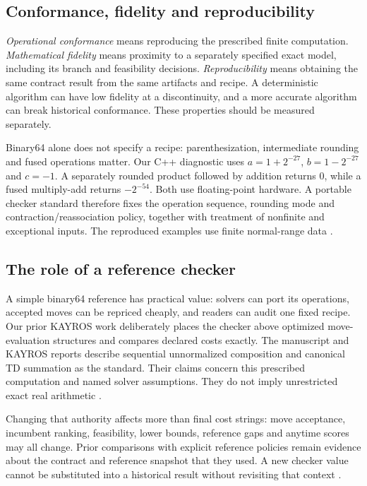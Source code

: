 \subsection{Conformance, fidelity and reproducibility}

\emph{Operational conformance} means reproducing the prescribed finite computation. \emph{Mathematical fidelity} means proximity to a separately specified exact model, including its branch and feasibility decisions. \emph{Reproducibility} means obtaining the same contract result from the same artifacts and recipe. A deterministic algorithm can have low fidelity at a discontinuity, and a more accurate algorithm can break historical conformance. These properties should be measured separately.

Binary64 alone does not specify a recipe: parenthesization, intermediate rounding and fused operations matter. Our C++ diagnostic uses $a=1+2^{-27}$, $b=1-2^{-27}$ and $c=-1$. A separately rounded product followed by addition returns $0$, while a fused multiply-add returns $-2^{-54}$. Both use floating-point hardware. A portable checker standard therefore fixes the operation sequence, rounding mode and contraction/reassociation policy, together with treatment of nonfinite and exceptional inputs. The reproduced examples use finite normal-range data \autocite{goldbergFloatingPoint1991}.

\subsection{The role of a reference checker}

A simple binary64 reference has practical value: solvers can port its operations, accepted moves can be repriced cheaply, and readers can audit one fixed recipe. Our prior KAYROS work deliberately places the checker above optimized move-evaluation structures and compares declared costs exactly. The manuscript and KAYROS reports describe sequential unnormalized composition and canonical TD summation as the standard. Their claims concern this prescribed computation and named solver assumptions. They do not imply unrestricted exact real arithmetic \autocite{rascoussierKAYROSAnytimeExact2026,rascoussierKAYROSTechReport2026}.

Changing that authority affects more than final cost strings: move acceptance, incumbent ranking, feasibility, lower bounds, reference gaps and anytime scores may all change. Prior comparisons with explicit reference policies remain evidence about the contract and reference snapshot that they used. A new checker value cannot be substituted into a historical result without revisiting that context \autocite{rascoussierAnytimeSolverEvaluation2026,rascoussierHexalyThreadScaling2026}.


